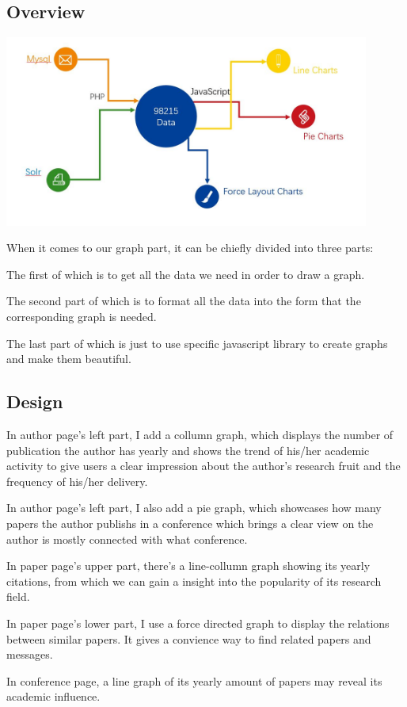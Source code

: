 \documentclass[10pt,twoside,a4paper,titlepage]{article}
\begin{document}
	\subsection{Overview}
		\includegraphics[width=0.9\textwidth]{gjl/overview.jpg}\newline\par
		When it comes to our graph part, it can be chiefly divided into three parts: \newline \par
		The first of which is to get all the data we need in order to draw a graph.\newline\par
		The second part of which is to format all the data into the form that the corresponding graph is needed.\newline\par
		The last part of which is just to use specific javascript library to create graphs and make them beautiful. \newline\par

	\subsection{Design}
		\par In author page’s left part, I add a collumn graph, which displays the number of publication the author has yearly and
shows the trend of his/her academic activity to give users a clear impression about the author’s research fruit and the frequency of his/her delivery.
		\par In author page’s left part, I also add a pie graph, which showcases how many papers the author publishs in a conference which brings a clear view on the author is mostly connected with what conference.
		\par In paper page's upper part, there’s a line-collumn graph showing its yearly citations, from which we can gain a insight into the popularity of its research field.
		\par In paper page's lower part, I use a force directed graph to display the relations between similar papers. It gives a convience way to find related papers and messages.
		\par In conference page, a line graph of its yearly amount of papers may reveal its academic influence.
\end{document}
